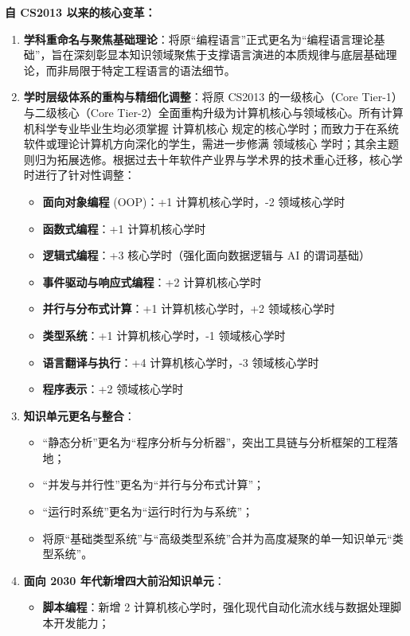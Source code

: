 \begin{preamblebox}[知识领域概述与变革]
\textbf{自 CS2013 以来的核心变革：}
\begin{enumerate}
    \item \textbf{学科重命名与聚焦基础理论}：将原“编程语言”正式更名为“编程语言理论基础”，旨在深刻彰显本知识领域聚焦于支撑语言演进的本质规律与底层基础理论，而非局限于特定工程语言的语法细节。
    \item \textbf{学时层级体系的重构与精细化调整}：将原 CS2013 的一级核心（Core Tier-1）与二级核心（Core Tier-2）全面重构升级为计算机核心与领域核心。所有计算机科学专业毕业生均必须掌握 计算机核心 规定的核心学时；而致力于在系统软件或理论计算机方向深化的学生，需进一步修满 领域核心 学时；其余主题则归为拓展选修。根据过去十年软件产业界与学术界的技术重心迁移，核心学时进行了针对性调整：
    \begin{itemize}
        \item \textbf{面向对象编程} (OOP)：+1 计算机核心学时，-2 领域核心学时
        \item \textbf{函数式编程}：+1 计算机核心学时
        \item \textbf{逻辑式编程}：+3 核心学时（强化面向数据逻辑与 AI 的谓词基础）
        \item \textbf{事件驱动与响应式编程}：+2 计算机核心学时
        \item \textbf{并行与分布式计算}：+1 计算机核心学时，+2 领域核心学时
        \item \textbf{类型系统}：+1 计算机核心学时，-1 领域核心学时
        \item \textbf{语言翻译与执行}：+4 计算机核心学时，-3 领域核心学时
        \item \textbf{程序表示}：+2 领域核心学时
    \end{itemize}
    \item \textbf{知识单元更名与整合}：
    \begin{itemize}
        \item “静态分析”更名为“程序分析与分析器”，突出工具链与分析框架的工程落地；
        \item “并发与并行性”更名为“并行与分布式计算”；
        \item “运行时系统”更名为“运行时行为与系统”；
        \item 将原“基础类型系统”与“高级类型系统”合并为高度凝聚的单一知识单元“类型系统”。
    \end{itemize}
    \item \textbf{面向 2030 年代新增四大前沿知识单元}：
    \begin{itemize}
        \item \textbf{脚本编程}：新增 2 计算机核心学时，强化现代自动化流水线与数据处理脚本开发能力；

\end{itemize}
\end{enumerate}
\end{preamblebox}
